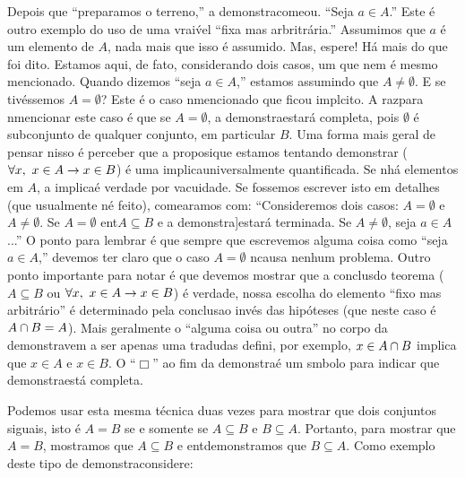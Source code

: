 Depois que ``preparamos o terreno,'' a demonstra\cao come\cc ou. ``Seja $a\in A$.'' Este \'e outro exemplo do uso de uma vrai\'vel ``fixa mas arbritr\'aria.'' Assumimos que $a$ \'e um elemento de $A$, nada mais que isso \'e assumido. Mas, espere! H\'a mais do que foi dito. Estamos aqui, de fato, considerando dois casos, um que nem \'e mesmo mencionado. Quando dizemos ``seja $a\in A$,'' estamos assumindo que $A\neq\emptyset$. E se tiv\'essemos $A=\emptyset$? Este \'e o caso n\ao mencionado que ficou impl\ih cito. A raz\ao para n\ao mencionar este caso \'e que se $A=\emptyset$, a demonstra\cao estar\'a completa, pois $\emptyset$ \'e subconjunto de qualquer conjunto, em particular $B$. Uma forma mais geral de pensar nisso \'e perceber que a proposi\cao que estamos tentando demonstrar ($\forall x, \textrm{ } x\in A\to x\in B $) \'e uma implica\cao universalmente quantificada. Se n\ao h\'a elementos em $A$, a implica\cao \'e verdade por vacuidade. Se fossemos escrever isto em detalhes (que usualmente n\ao \'e feito), come\cc ar\ih amos com: ``Consideremos dois casos: $A=\emptyset$ e $A\neq\emptyset$. Se $A=\emptyset$ ent\ao $A\subseteq B$ e a demonstra]\cao estar\'a terminada. Se $A\neq\emptyset$, seja $a\in A$ ...'' O ponto para lembrar \'e que sempre que escrevemos alguma coisa como ``seja $a\in A$,'' devemos ter claro que o caso $A=\emptyset$ n\ao causa nenhum problema. Outro ponto importante para notar \'e que devemos mostrar que a conclus\ao do teorema ($A\subseteq B$ ou $\forall x, \textrm{ } x\in A\to x\in B$) \'e verdade, nossa escolha do elemento ``fixo mas arbitr\'ario'' \'e determinado pela conclus\ao ao inv\'es das hip\'oteses (que neste caso \'e $A\cap B=A$). Mais geralmente o ``alguma coisa ou outra'' no corpo da demonstra\cao vem a ser apenas uma tradu\cao das defini\cois, por exemplo,  $x\in A\cap B$ implica que $x\in A$ e $x\in B$. O ``$\Box$'' ao fim da demonstra\cao \'e um s\ih mbolo para indicar que demonstra\cao est\'a completa.

Podemos usar esta mesma t\'ecnica duas vezes para mostrar que dois conjuntos s\ao iguais, isto \'e $A=B$ se e somente se $A\subseteq B$ e $B\subseteq A$. Portanto, para mostrar que $A=B$, mostramos que $A\subseteq B$ e ent\ao demonstramos que $B\subseteq A$. Como exemplo deste tipo de demonstra\cao considere:

